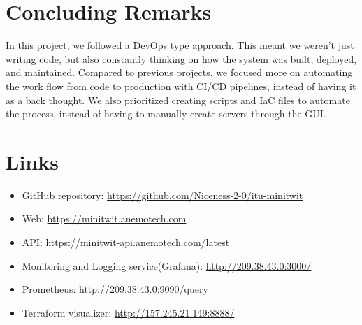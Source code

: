 \section{Concluding Remarks}


In this project, we followed a DevOps type approach. This meant we weren’t just writing code, but also constantly thinking on how the system was built, deployed, and maintained. Compared to previous projects, we focused more on automating the work flow from code to production with CI/CD pipelines, instead of having it as a back thought. We also prioritized creating scripts and IaC files to automate the process, instead of having to manually create servers through the GUI.

\section{Links}
\begin{itemize}
    \item GitHub repository: \url{https://github.com/Niceness-2-0/itu-minitwit}
    \item Web: \url{https://minitwit.anemotech.com}
    \item API: \url{https://minitwit-api.anemotech.com/latest}
    \item Monitoring and Logging service(Grafana): \url{http://209.38.43.0:3000/}
    \item Prometheus: \url{http://209.38.43.0:9090/query}
    \item Terraform visualizer: \url{http://157.245.21.149:8888/}
\end{itemize}




